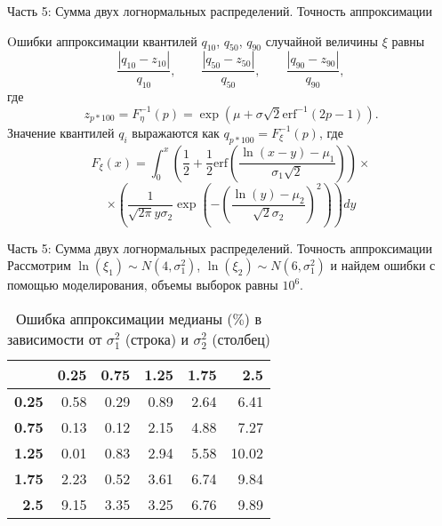 \documentclass[ucs, notheorems, handout]{beamer}
\begin{document}
\begin{frame}{Часть 5: Сумма двух логнормальных распределений. Точность аппроксимации }
	
	Oшибки аппроксимации квантилей $q_{10}$, $q_{50}$, $q_{90}$ случайной величины $\xi$ равны
\[\dfrac{\left| q_{10} - z_{10}\right|}{q_{10}}, \quad\quad \dfrac{\left| q_{50} - z_{50}\right|}{q_{50}}, \quad\quad \dfrac{\left| q_{90} - z_{90}\right|}{q_{90}},\] где
\[z_{p*100} = F_{\eta}^{-1}(p) = \exp(\mu+\sigma\sqrt{2}\mathrm{erf}^{-1}(2p-1)).\]
Значение квантилей $q_{i}$ выражаются как $q_{p*100} = F_{\xi}^{-1}(p)$, где
\[F_{\xi}(x) = \int_{0}^{x}\left( \dfrac{1}{2}+\dfrac{1}{2} \mathrm{erf}\left( \dfrac{\ln(x-y)-\mu_{1}}{\sigma_{1}\sqrt{2}}\right) \right)\times\]
\[\times \left( \dfrac{1}{\sqrt{2\pi}y\sigma_{2}}\exp\left( -\left( \dfrac{\ln(y)-\mu_{2}}{\sqrt{2}\sigma_{2}}\right) ^{2}\right) \right) dy \]
	
\end{frame}

\begin{frame}{Часть 5: Сумма двух логнормальных распределений. Точность аппроксимации }
	Рассмотрим $\ln(\xi_{1}) \sim N(4, \sigma _{1}^{2})$, $\ln(\xi_{2}) \sim N(6, \sigma _{1}^{2})$ и найдем ошибки с помощью моделирования, объемы выборок равны $10^{6}$.
	
	
	\begin{table}[ht]
		\centering
		\caption{Ошибка аппроксимации медианы ($\%$) в зависимости от $\sigma_{1}^{2}$ (строка) и $\sigma_{2}^{2}$ (столбец)}
		\begin{tabular}{rrrrrr}
			\hline
			& \textbf{0.25} & \textbf{0.75} & \textbf{1.25} & \textbf{1.75} & \textbf{2.5} \\ 
			\hline
			\textbf{0.25} & 0.58 & 0.29 & 0.89 & 2.64 & 6.41 \\ 
			\textbf{0.75} & 0.13 & 0.12 & 2.15 & 4.88 & 7.27 \\ 
			\textbf{1.25} & 0.01 & 0.83 & 2.94 & 5.58 & 10.02 \\ 
			\textbf{1.75} & 2.23 & 0.52 & 3.61 & 6.74 & 9.84 \\ 
			\textbf{2.5} & 9.15 & 3.35 & 3.25 & 6.76 & 9.89 \\ 
			\hline
		\end{tabular}
	\end{table}
	
\end{frame}
\end{document}
